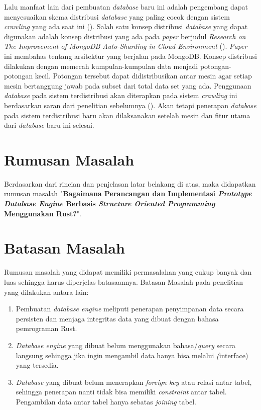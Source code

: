 Lalu manfaat lain dari pembuatan \emph{database} baru ini adalah pengembang dapat menyesuaikan skema distribusi \emph{database} yang paling cocok dengan 
sistem \emph{crawling} yang ada saat ini (\cite{ridho2024}). Salah satu konsep distribusi \emph{database} yang dapat digunakan adalah konsep distribusi yang ada
pada \emph{paper} berjudul \emph{Research on The Improvement of MongoDB Auto-Sharding in Cloud Environment} (\cite{improvementsharding}). \emph{Paper}
ini membahas tentang arsitektur yang berjalan pada MongoDB. Konsep distribusi dilakukan dengan memecah 
kumpulan-kumpulan data menjadi potongan-potongan kecil. Potongan tersebut dapat didistribusikan antar mesin agar setiap mesin 
bertanggung jawab pada subset dari total data set yang ada. Penggunaan \emph{database} pada sistem terdistribusi akan diterapkan pada sistem \emph{crawling} ini berdasarkan 
saran dari penelitian sebelumnya (\cite{ridho2024}). Akan tetapi penerapan \emph{database} pada sistem terdistribusi baru akan dilaksanakan setelah mesin dan fitur utama dari 
\emph{database} baru ini selesai.

\section{Rumusan Masalah}
Berdasarkan dari rincian dan penjelasan latar belakang di atas, maka didapatkan 
rumusan masalah "\textbf{Bagaimana Perancangan dan Implementasi \emph{Prototype Database Engine} Berbasis 
\emph{Structure Oriented Programming} Menggunakan Rust?}".

\section{Batasan Masalah}
Rumusan masalah yang didapat memiliki permasalahan yang cukup banyak dan luas 
sehingga harus diperjelas batasaannya. Batasan Masalah pada penelitian yang 
dilakukan antara lain:
\begin{enumerate}
	\item{
		Pembuatan \emph{database engine} meliputi penerapan penyimpanan data 
		secara persisten dan menjaga integritas data yang dibuat dengan bahasa pemrograman 
		Rust.
	}
	\item{
		\emph{Database engine} yang dibuat belum menggunakan bahasa/\emph{query} secara langsung 
		sehingga jika ingin mengambil data hanya bisa melalui \emph(interface) yang 
		tersedia.
	}
	\item{
		\emph{Database} yang dibuat belum menerapkan \emph{foreign key} atau relasi antar tabel, 
		sehingga penerapan nanti tidak bisa memiliki \emph{constraint} antar tabel. Pengambilan 
		data antar tabel hanya sebatas \emph{joining} tabel.
	}
\end{enumerate}

